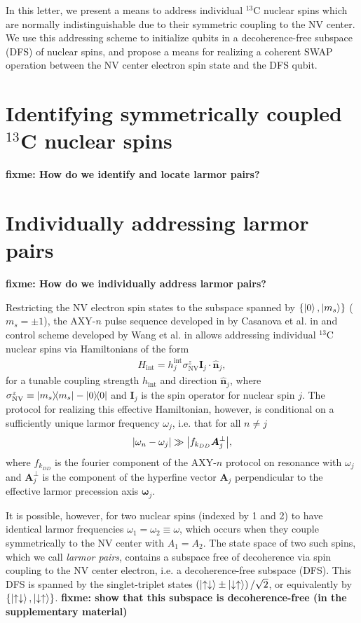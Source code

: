 \documentclass[twocolumn]{revtex4-1}
\renewcommand{\t}{\text} %
\newcommand{\p}[1]{\left(#1\right)} %
\renewcommand{\set}[1]{\left\{#1\right\}} %
\renewcommand{\v}{\bm} %
\newcommand{\uv}[1]{\hat{\v{#1}}} %
\renewcommand{\c}{\cdot} %
\renewcommand{\u}{\uparrow}
\renewcommand{\d}{\downarrow}
\newcommand{\NV}{\t{NV}}
\newcommand{\fixme}[1]{{\bf \color{red} fixme: #1}}
\begin{document}
In this letter, we present a means to address individual $^{13}$C
nuclear spins which are normally indistinguishable due to their
symmetric coupling to the NV center. We use this addressing scheme to
initialize qubits in a decoherence-free subspace (DFS) of nuclear
spins, and propose a means for realizing a coherent SWAP operation
between the NV center electron spin state and the DFS qubit.

\section{Identifying symmetrically coupled $^{13}$C nuclear spins}

\fixme{How do we identify and locate larmor pairs?}

\section{Individually addressing larmor pairs}

\fixme{How do we individually address larmor pairs?}

Restricting the NV electron spin states to the subspace spanned by
$\set{\ket0,\ket{m_s}}$ ($m_s=\pm1$), the AXY-$n$ pulse sequence
developed in by Casanova et al. in \cite{casanova2015robust} and
control scheme developed by Wang et al. in \cite{wang2016positioning}
allows addressing individual $^{13}$C nuclear spins via Hamiltonians
of the form
\begin{align}
  H_\t{int} = h_j^\t{int}\sigma_\NV^z\v I_j\c\uv n_j,
  \label{H_int}
\end{align}
for a tunable coupling strength $h_\t{int}$ and direction $\uv n_j$,
where $\sigma_\NV^z\equiv\op{m_s}-\op{0}$ and $\v I_j$ is the spin
operator for nuclear spin $j$. The protocol for realizing this
effective Hamiltonian, however, is conditional on a sufficiently
unique larmor frequency $\omega_j$, i.e. that for all $n\ne j$
\begin{align}
  \abs{\omega_n-\omega_j} \gg \abs{f_{k_{DD}}\v A_j^\perp},
\end{align}
where $f_{k_{DD}}$ is the fourier component of the AXY-$n$ protocol on
resonance with $\omega_j$ and $\v A_j^\perp$ is the component of the
hyperfine vector $\v A_j$ perpendicular to the effective larmor
precession axis $\v\omega_j$.

It is possible, however, for two nuclear spins (indexed by 1 and 2) to
have identical larmor frequencies $\omega_1=\omega_2\equiv\omega$,
which occurs when they couple symmetrically to the NV center with
$A_1=A_2$. The state space of two such spins, which we call {\it
  larmor pairs}, contains a subspace free of decoherence via spin
coupling to the NV center electron, i.e. a decoherence-free subspace
(DFS). This DFS is spanned by the singlet-triplet states
$\p{\ket{\u\d}\pm\ket{\d\u}}/\sqrt2$, or equivalently by
$\set{\ket{\u\d},\ket{\d\u}}$. \fixme{show that this subspace is
  decoherence-free (in the supplementary material)}
\end{document}
